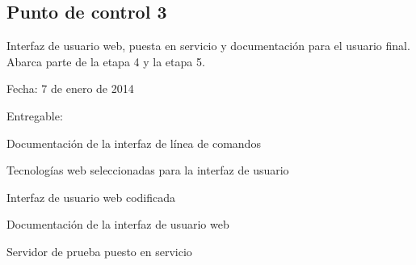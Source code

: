 \documentclass[12pt,bibliography=oldstyle,DIV=12,parskip=full-,titlepage]{scrartcl}
\begin{document}
\subsection{Punto de control 3}
Interfaz de usuario web, puesta en servicio y documentación para el
usuario final. Abarca parte de la etapa 4 y la etapa 5.
\begin{description*}
  \item[Fecha:] 7 de enero de 2014
  \item[Entregable:]
  \item
    \begin{minipage}{\textwidth}
      \medskip
      \begin{itemize*}
      \item Documentación de la interfaz de línea de comandos
      \item Tecnologías web seleccionadas para la interfaz de usuario
      \item Interfaz de usuario web codificada
      \item Documentación de la interfaz de usuario web
      \item Servidor de prueba puesto en servicio
      \end{itemize*}
    \end{minipage}
\end{description*}
%
%
\newpage
\end{document}

